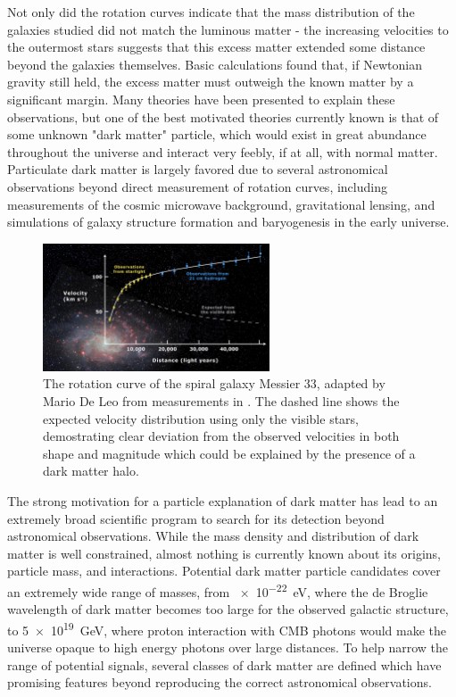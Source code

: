 Not only did the rotation curves indicate that the mass distribution of the galaxies studied did not match the luminous matter - the increasing velocities to the outermost stars suggests that this excess matter extended some distance beyond the galaxies themselves. 
Basic calculations found that, if Newtonian gravity still held, the excess matter must outweigh the known matter by a significant margin. 
Many theories have been presented to explain these observations, but one of the best motivated theories currently known is that of some unknown "dark matter" particle, which would exist in great abundance throughout the universe and interact very feebly, if at all, with normal matter.
Particulate dark matter is largely favored due to several astronomical observations beyond direct measurement of rotation curves, including measurements of the cosmic microwave background, gravitational lensing, and simulations of galaxy structure formation and baryogenesis in the early universe.

\begin{figure}
   \label{fig:rotCurve}
   \centering
   \includegraphics[width=0.6\textwidth]{figures/rotation_curve.png}
   \caption[Rotation curve of Messier 33]{The rotation curve of the spiral galaxy Messier 33, adapted by Mario De Leo from measurements in \cite{Corbelli}. The dashed line shows the expected velocity distribution using only the visible stars, demostrating clear deviation from the observed velocities in both shape and magnitude which could be explained by the presence of a dark matter halo.}
\end{figure}

The strong motivation for a particle explanation of dark matter has lead to an extremely broad scientific program to search for its detection beyond astronomical observations. 
While the mass density and distribution of dark matter is well constrained, almost nothing is currently known about its origins, particle mass, and interactions.
Potential dark matter particle candidates cover an extremely wide range of masses, from \SI{e-22}{\eV}, where the de Broglie wavelength of dark matter becomes too large for the observed galactic structure, to \SI{5e19}{\giga\eV}, where proton interaction with CMB photons would make the universe opaque to high energy photons over large distances.
To help narrow the range of potential signals, several classes of dark matter are defined which have promising features beyond reproducing the correct astronomical observations. 

